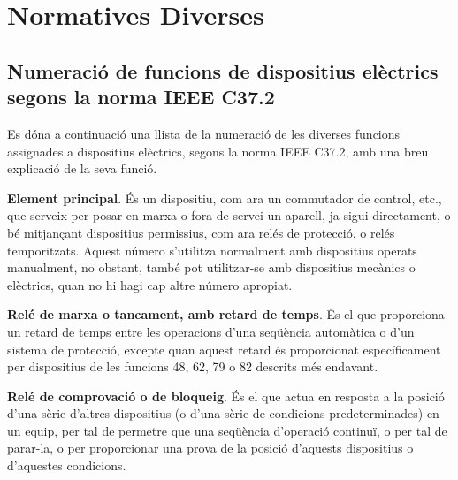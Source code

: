 \chapter{Normatives Diverses}

\section{Numeració de funcions de dispositius elèctrics segons la norma IEEE C37.2 }\label{sec:ieee-c37-2}

Es dóna a continuació una llista de la numeració de les diverses funcions assignades a dispositius
elèctrics, segons la norma IEEE C37.2, amb una breu
explicació de la seva funció.

\begin{multicols}{2}
\begin{list}{}
{\setlength{\labelwidth}{6mm} \setlength{\leftmargin}{6mm}
\setlength{\labelsep}{2mm}}

\item[\textbf{1}]  
\textbf{Element principal}. És un dispositiu, com ara un commutador de control, etc., que serveix per posar en marxa o fora de servei un aparell, ja sigui directament, o bé  mitjançant
dispositius permissius, com ara relés de protecció, o relés temporitzats. Aquest número s'utilitza normalment amb dispositius operats manualment, no obstant, també pot utilitzar-se amb dispositius mecànics o elèctrics, quan no hi hagi cap altre número apropiat.

\item[\textbf{2}]    
  
\textbf{Relé
de marxa o tancament, amb retard de temps}. És el que
proporciona un retard de temps entre les operacions d'una seqüència
automàtica o d'un sistema de protecció, excepte quan aquest retard
és proporcionat específicament per dispositius de les funcions 48, 62, 79 o 82
descrits més endavant.

\item[\textbf{3}]  
 \textbf{Relé de comprovació o
de bloqueig}. És el que actua en resposta a la posició d'una sèrie
d'altres dispositius (o d'una sèrie de condicions predeterminades)
en un equip, per tal de permetre que una seqüència d'operació
continuï, o per tal de parar-la, o per proporcionar una prova de la
posició d'aquests dispositius o d'aquestes condicions.


\end{list}
\end{multicols}
